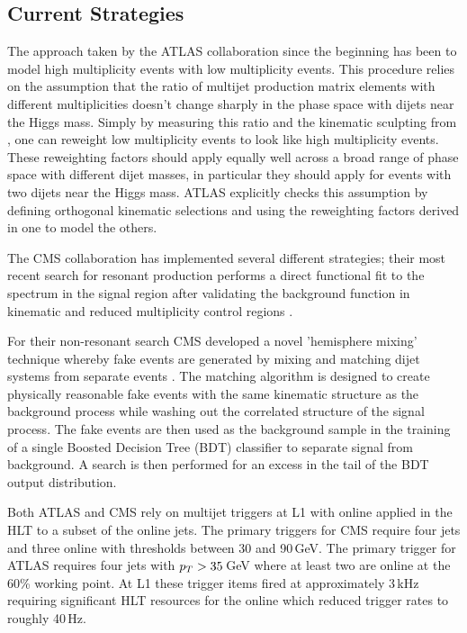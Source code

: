 \subsection{Current Strategies}
\label{sec:current4b}

The approach taken by the ATLAS collaboration since the beginning has been to model high \bjet multiplicity events with low \bjet multiplicity events.
This procedure relies on the assumption that the ratio of multijet production matrix elements with different \bjet multiplicities doesn't change sharply in the phase space with dijets near the Higgs mass.
Simply by measuring this ratio and the kinematic sculpting from \btagging, one can reweight low \bjet multiplicity events to look like high \bjet multiplicity events.
These reweighting factors should apply equally well across a broad range of phase space with different dijet masses, in particular they should apply for events with two dijets near the Higgs mass. 
ATLAS explicitly checks this assumption by defining orthogonal kinematic selections and using the reweighting factors derived in one to model the others. 

The CMS collaboration has implemented several different strategies;
their most recent search for resonant \hh production performs a direct functional fit to the \mhh spectrum in the signal region
after validating the background function in kinematic and reduced \btag multiplicity control regions \cite{Sirunyan:2018zkk}.

For their non-resonant search CMS developed a novel 'hemisphere mixing' technique whereby fake events are generated by mixing and matching dijet systems from separate events \cite{CMS-PAS-HIG-17-017}.
The matching algorithm is designed to create physically reasonable fake events with the same kinematic structure as the background process while washing out the correlated structure of the signal process.
The fake events are then used as the background sample in the training of a single Boosted Decision Tree (BDT) classifier to separate signal from background.
A search is then performed for an excess in the tail of the BDT output distribution.

Both ATLAS and CMS rely on multijet triggers at L1 with online \btagging applied in the HLT to a subset of the online jets.
The primary triggers for CMS require four jets and three online \btags with \pt thresholds between 30 and 90\,GeV.
The primary trigger for ATLAS requires four jets with $p_T>35\,$GeV where at least two are \btagged online at the 60\% working point.
At L1 these trigger items fired at approximately 3\,kHz requiring significant HLT resources for the online \btagging which reduced trigger rates to roughly 40\,Hz. 

